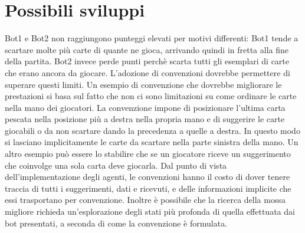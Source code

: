 \documentclass{article}
\begin{document}
\section{Possibili sviluppi}
Bot1 e Bot2 non raggiungono punteggi elevati per motivi differenti: Bot1 tende a scartare molte più carte di quante ne gioca, arrivando quindi in fretta alla fine della partita. Bot2 invece perde punti perchè scarta tutti gli esemplari di carte che erano ancora da giocare.\newline
L'adozione di convenzioni dovrebbe permettere di superare questi limiti.\newline
\newline
Un esempio di convenzione che dovrebbe migliorare le prestazioni si basa sul fatto che non ci sono limitazioni su come ordinare le carte nella mano dei giocatori. La convenzione impone di posizionare l'ultima carta pescata nella posizione più a destra nella propria mano e di suggerire le carte giocabili o da non scartare dando la precedenza a quelle a destra. In questo modo si lasciano implicitamente le carte da scartare nella parte sinistra della mano.\newline
\newline
Un altro esempio può essere lo stabilire che se un giocatore riceve un suggerimento che coinvolge una sola carta deve giocarla.\newline
\newline
Dal punto di vista dell'implementazione degli agenti, le convenzioni hanno il costo di dover tenere traccia di tutti i suggerimenti, dati e ricevuti, e delle informazioni implicite che essi trasportano per convenzione. Inoltre è possibile che la ricerca della mossa migliore richieda un'esplorazione degli stati più profonda di quella effettuata dai bot presentati, a seconda di come la convenzione è formulata.
\end{document}
